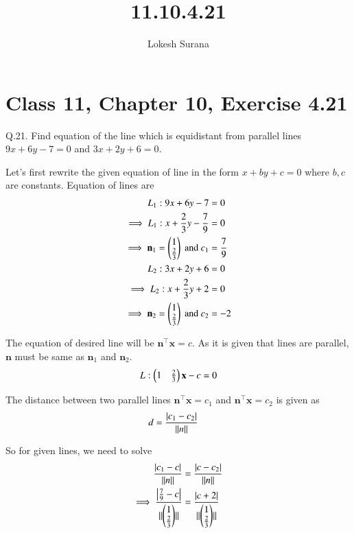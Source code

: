 \documentclass[journal,12pt,twocolumn]{IEEEtran}
\renewcommand{\vec}[1]{\boldsymbol{\mathbf{#1}}}
\begin{document}
\vspace{3cm}
\title{11.10.4.21}
\author{Lokesh Surana}
\maketitle
\section*{Class 11, Chapter 10, Exercise 4.21}

Q.21. Find equation of the line which is equidistant from parallel lines $9{x} + 6{y} - 7 = 0$ and $3{x} + 2{y} + 6 = 0$.

\solution Let's first rewrite the given equation of line in the form $x + by + c = 0$ where $b, c$ are constants.
Equation of lines are
\begin{align}
    {L}_1: 9{x} + 6{y} - 7 &= 0\\
    \implies {L}_1: {x} + \frac{2}{3}{y} - \frac{7}{9} &= 0\\
    \implies \vec{n}_1 = \myvec{1\\\frac{2}{3}} \text{ and } {c}_1 &= \frac{7}{9}\\
    {L}_2: 3{x} + 2{y} + 6 &= 0 \\
    \implies {L}_2: {x} + \frac{2}{3}{y} + 2 &= 0\\
    \implies \vec{n}_2 = \myvec{1\\\frac{2}{3}} \text{ and } {c}_2 &= -2
\end{align}

The equation of desired line will be $\vec{n}^{\top}\vec{x} = c$.
As it is given that lines are parallel, $\vec{n}$ must be same as $\vec{n}_1$ and $\vec{n}_2$.
\begin{align}
	{L}: \myvec{1&\frac{2}{3}}\vec{x} - c = 0
\end{align}

The distance between two parallel lines $\vec{n}^{\top}\vec{x} = {c}_1$ and $\vec{n}^{\top}\vec{x} = {c}_2$ is given as
\begin{align}
	{d} &= \frac{\left\vert{c}_1 - {c}_2\right\vert}{\lVert n\rVert}
\end{align}

So for given lines, we need to solve
\begin{align}
	\frac{\left\vert{c}_1 - {c}\right\vert}{\lVert n\rVert} &= \frac{\left\vert{c}-{c}_2\right\vert}{\lVert n\rVert}\\
	\implies \frac{\left\vert\frac{7}{9} - {c}\right\vert}{\lVert\begin{pmatrix}1\\\frac{2}{3}\end{pmatrix}\rVert} &= \frac{\left\vert{c} + 2\right\vert}{\lVert\begin{pmatrix}1\\\frac{2}{3}\end{pmatrix}\rVert}
\end{align}
\end{document}
